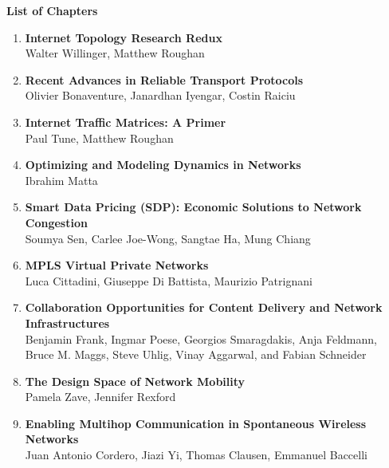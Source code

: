 
%





\begin{center}
{\Huge \textbf{List of Chapters}}
\end{center}

\vspace{1cm}

\large

\begin{enumerate}
\item \textbf{Internet Topology Research Redux}\\
Walter Willinger, Matthew Roughan 


\item \textbf{Recent Advances in Reliable Transport Protocols}\\
Olivier Bonaventure, Janardhan Iyengar, Costin Raiciu
	
\item \textbf{Internet Traffic Matrices: A Primer} \\
Paul Tune, Matthew Roughan

	
\item \textbf{Optimizing and Modeling Dynamics in Networks } \\
Ibrahim Matta


\item \textbf{Smart Data Pricing (SDP): Economic Solutions to Network Congestion} \\
Soumya Sen, Carlee Joe-Wong, Sangtae Ha, Mung Chiang


\item \textbf{MPLS Virtual Private Networks } \\
Luca Cittadini, Giuseppe Di Battista, Maurizio Patrignani


\item \textbf{Collaboration Opportunities for Content Delivery and Network Infrastructures} \\
Benjamin Frank, Ingmar Poese, Georgios Smaragdakis, Anja Feldmann, Bruce M. Maggs, Steve Uhlig, Vinay Aggarwal, and Fabian Schneider

	
\item \textbf{The Design Space of Network Mobility} \\
Pamela Zave, Jennifer Rexford


	
\item \textbf{Enabling Multihop Communication in Spontaneous Wireless Networks} \\
Juan Antonio Cordero, Jiazi Yi, Thomas Clausen, Emmanuel Baccelli

\end{enumerate}



%